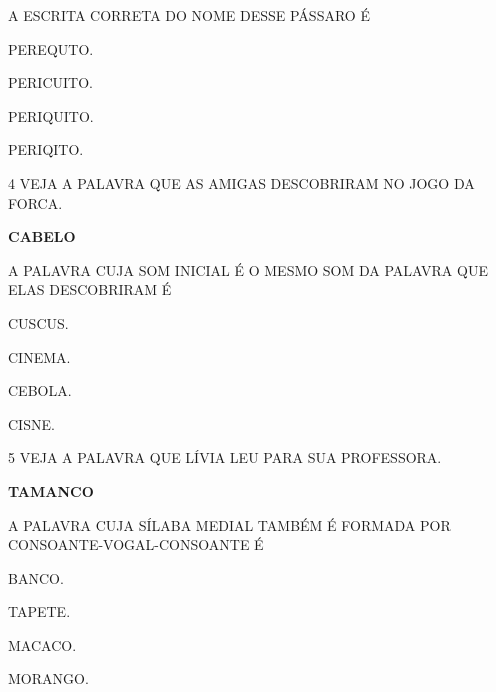 A ESCRITA CORRETA DO NOME DESSE PÁSSARO É

\begin{escolha}

\item PEREQUTO.

\item PERICUITO.

\item PERIQUITO.

\item PERIQITO.

\end{escolha}

\num{4} VEJA A PALAVRA QUE AS AMIGAS DESCOBRIRAM NO JOGO DA FORCA.

\begin{myquote}
\begin{center}
\textbf{CABELO}
\end{center}
\end{myquote}

A PALAVRA CUJA SOM INICIAL É O MESMO SOM DA PALAVRA QUE ELAS DESCOBRIRAM É

\begin{escolha}

\item CUSCUS.

\item CINEMA.

\item CEBOLA.

\item CISNE.

\end{escolha}

\num{5} VEJA A PALAVRA QUE LÍVIA LEU PARA SUA PROFESSORA.

\begin{myquote}
\begin{center}
\textbf{TAMANCO}
\end{center}
\end{myquote}

A PALAVRA CUJA SÍLABA MEDIAL TAMBÉM É FORMADA POR CONSOANTE-VOGAL-CONSOANTE É

\begin{escolha}

\item BANCO.

\item TAPETE.

\item MACACO.

\item MORANGO.

\end{escolha}

